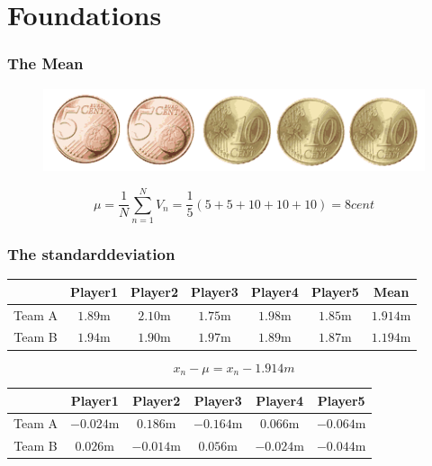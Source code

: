 \documentclass{beamer}
\begin{document}
\section{Foundations}

\begin{frame}
    \frametitle{The Mean}
    \begin{figure}
        \centering
        \includegraphics[width=1\textwidth]{images/graphics/coins.png}
    \end{figure}
    \vspace{1cm}
    \begin{equation*}
        \mu = \frac{1}{N} \sum _{n=1}^{N}V_{n}= \frac{1}{5} \left( 5+5+10+10+10 \right) = 8 cent
    \end{equation*}
\end{frame}

\begin{frame}
    \frametitle{The standarddeviation}


    \footnotesize
    \begin{tabular}{ c|ccccc|c }
        \hline
             & Player1 & Player2 & Player3 & Player4 & Player5 & Mean \\ 
        \hline
            Team A & \(1.89\)m & \(2.10\)m & \(1.75\)m & \(1.98\)m & \(1.85\)m & \(1.914\)m \\ 
            Team B & \(1.94\)m & \(1.90\)m & \(1.97\)m & \(1.89\)m & \(1.87\)m & \(1.194\)m \\ 
        \hline
    \end{tabular}

    \vspace{0.5cm}

    \normalsize
    \begin{equation*}
        x_{n} -  \mu = x_{n}-1.914m
    \end{equation*}

    \vspace{0.5cm}

    \footnotesize
    \begin{tabular}{ c|ccccc }
        \hline
             & Player1 & Player2 & Player3 & Player4 & Player5 \\ 
        \hline
            Team A & \(-0.024\)m & \(0.186\)m & \(-0.164\)m & \(0.066\)m & \(-0.064\)m \\ 
            Team B & \(0.026\)m & \(-0.014\)m & \(0.056\)m & \(-0.024\)m & \(-0.044\)m \\ 
        \hline
    \end{tabular}


\end{frame}
\end{document}
